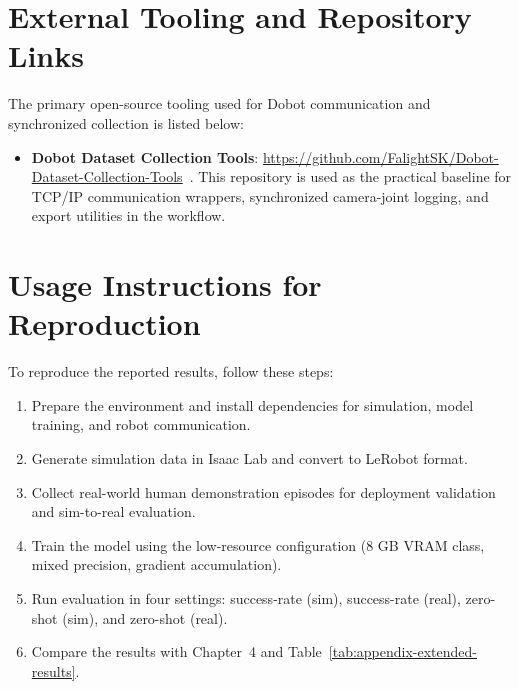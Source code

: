 \section{External Tooling and Repository Links}
\label{app:external-tools}

The primary open-source tooling used for Dobot communication and synchronized
collection is listed below:

\begin{itemize}
    \item \textbf{Dobot Dataset Collection Tools}:\newline
    \url{https://github.com/FalightSK/Dobot-Dataset-Collection-Tools}~\cite{falightsk2025dobot}. This repository is used as the practical baseline for TCP/IP communication wrappers, synchronized camera-joint logging, and export utilities in the workflow.
\end{itemize}

\section{Usage Instructions for Reproduction}
To reproduce the reported results, follow these steps:

\begin{enumerate}
    \item Prepare the environment and install dependencies for simulation, model training, and robot communication.
    \item Generate simulation data in Isaac Lab and convert to LeRobot format.
    \item Collect real-world human demonstration episodes for deployment validation and sim-to-real evaluation.
    \item Train the model using the low-resource configuration (8 GB VRAM class, mixed precision, gradient accumulation).
    \item Run evaluation in four settings: success-rate (sim), success-rate (real), zero-shot (sim), and zero-shot (real).
    \item Compare the results with Chapter~4 and Table~\ref{tab:appendix-extended-results}.
\end{enumerate}

\clearpage